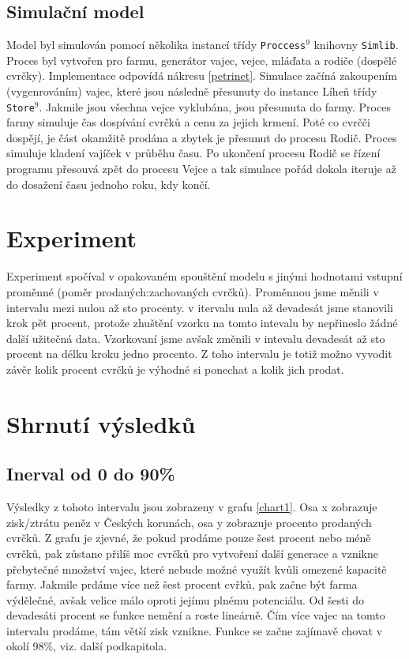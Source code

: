 \documentclass[a4paper, 12pt]{extarticle}
\begin{document}
\subsection{Simulační model}
Model byl simulován pomocí několika instancí třídy \texttt{Proccess}$^{9}$ knihovny \texttt{Simlib}. Proces byl vytvořen pro farmu, generátor vajec, vejce, mláďata a rodiče (dospělé cvrčky). Implementace odpovídá nákresu \ref{petrinet}. Simulace začíná zakoupením (vygenrováním) vajec, které jsou následně přesunuty do instance Líheň třídy \texttt{Store}$^{9}$. Jakmile jsou všechna vejce vyklubána, jsou přesunuta do farmy. Proces farmy simuluje čas dospívání cvrčků a cenu za jejich krmení. Poté co cvrčči dospějí, je část okamžitě prodána a zbytek je přesunut do procesu Rodič. Proces simuluje kladení vajíček v průběhu času. Po ukončení procesu Rodič se řízení programu přesouvá zpět do procesu Vejce a tak simulace pořád dokola iteruje až do dosažení času jednoho roku, kdy končí.

\newpage

\section{Experiment}
Experiment spočíval v opakovaném spouštění modelu s jinými hodnotami vstupní proměnné (poměr prodaných:zachovaných cvrčků). Proměnnou jsme měnili v intervalu mezi nulou až sto procenty. v itervalu nula až devadesát jsme stanovili krok pět procent, protože zhuštění vzorku na tomto intevalu by nepřineslo žádné další užitečná data. Vzorkovaní jsme avšak změnili v intevalu devadesát až sto procent na délku kroku jedno procento. Z toho intervalu je totiž možno vyvodit závěr kolik procent cvrčků je výhodné si ponechat a kolik jich prodat. 


\section{Shrnutí výsledků} \label{zaver}

\subsection{Inerval od 0 do 90{\%}}
Výsledky z tohoto intervalu jsou zobrazeny v grafu \ref{chart1}. Osa x zobrazuje zisk/ztrátu peněz v Českých korunách, osa y zobrazuje procento prodaných cvrčků. Z grafu je zjevné, že pokud prodáme pouze šest procent nebo méně cvrčků, pak zůstane přilíš moc cvrčků pro vytvoření další generace a vznikne přebytečné množství vajec, které nebude možné využít kvůli omezené kapacitě farmy. Jakmile prdáme více než šest procent cvřků, pak začne být farma výdělečné, avšak velice málo oproti jejímu plnému potenciálu. Od šesti do devadesáti procent se funkce nemění a roste lineárně. Čím více vajec na tomto intervalu prodáme, tám větší zisk vznikne. Funkce se začne zajímavě chovat v okolí 98\%, viz. další podkapitola.
\end{document}
